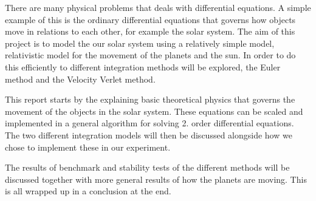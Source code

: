 
There are many physical problems that deals with differential equations. A simple example of this is the ordinary differential equations that governs how objects move in relations to each other, for example the solar system. The aim of this project is to model the our solar system using a relatively simple model, relativistic model for the movement of the planets and the sun. In order to do this efficiently to different integration methods will be explored, the Euler method and the Velocity Verlet method. 


This report starts by the explaining basic theoretical physics that governs the movement of the objects in the solar system. These equations can be scaled and implemented in a general algorithm for solving 2. order differential equations. The two different integration models will then be discussed alongside how we chose to implement these in our experiment.

The results of benchmark and stability tests of the different methods will be discussed together with more general results of how the planets are moving. This is all wrapped up in a conclusion at the end.
